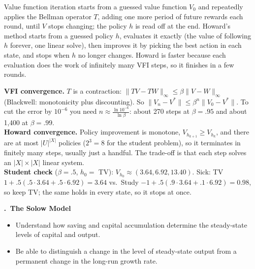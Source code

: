\documentclass[11pt]{article}
\newcounter{qn}
\newcommand{\question}[1]{\par\needspace{14\baselineskip}\refstepcounter{qn}\medskip
{\bfseries\color{ink}\large \theqn.\ #1}\par\smallskip}
\begin{document}
\begin{resp}
Value function iteration starts from a guessed value function $V_0$ and repeatedly applies the Bellman operator $T$, adding one more period of future rewards each round, until $V$ stops changing; the policy $h$ is read off at the end. Howard's method starts from a guessed policy $h$, evaluates it exactly (the value of following $h$ forever, one linear solve), then improves it by picking the best action in each state, and stops when $h$ no longer changes. Howard is faster because each evaluation does the work of infinitely many VFI steps, so it finishes in a few rounds.
\end{resp}
\begin{intu}
\textbf{VFI convergence.} $T$ is a contraction: $\|TV-TW\|_\infty\le\beta\|V-W\|_\infty$ (Blackwell: monotonicity plus discounting). So $\|V_n-V^*\|\le\beta^n\|V_0-V^*\|$. To cut the error by $10^{-6}$ you need $n\approx\frac{\ln10^{-6}}{\ln\beta}$: about 270 steps at $\beta=.95$ and about 1{,}400 at $\beta=.99$.\\
\textbf{Howard convergence.} Policy improvement is monotone, $V_{h_{k+1}}\ge V_{h_k}$, and there are at most $|U|^{|X|}$ policies ($2^3=8$ for the student problem), so it terminates in finitely many steps, usually just a handful. The trade-off is that each step solves an $|X|\times|X|$ linear system.\\
\textbf{Student check} ($\beta=.5$, $h_0=$ TV): $V_{h_0}\approx(3.64,6.92,13.40)$. Sick: TV $1+.5(.5\cdot3.64+.5\cdot6.92)=3.64$ vs.\ Study $-1+.5(.9\cdot3.64+.1\cdot6.92)=0.98$, so keep TV; the same holds in every state, so it stops at once.
\end{intu}

\question{The Solow Model}
\begin{itemize}[leftmargin=1.2em,itemsep=0pt]\itshape
\item Understand how saving and capital accumulation determine the steady-state levels of capital and output.
\item Be able to distinguish a change in the level of steady-state output from a permanent change in the long-run growth rate.
\end{itemize}
\end{document}
